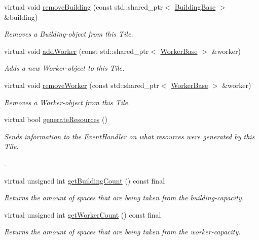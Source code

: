 \begin{DoxyCompactItemize}
virtual void \hyperlink{classCourse_1_1TileBase_a0cb0e1f7b13ca68b452e6f4846266d87}{remove\-Building} (const std\-::shared\-\_\-ptr$<$ \hyperlink{classCourse_1_1BuildingBase}{Building\-Base} $>$ \&building)
\begin{DoxyCompactList}\small\item\em Removes a Building-\/object from this Tile. \end{DoxyCompactList}\item 
virtual void \hyperlink{classCourse_1_1TileBase_ac512085412a2f4b9b30841ed265fd706}{add\-Worker} (const std\-::shared\-\_\-ptr$<$ \hyperlink{classCourse_1_1WorkerBase}{Worker\-Base} $>$ \&worker)
\begin{DoxyCompactList}\small\item\em Adds a new Worker-\/object to this Tile. \end{DoxyCompactList}\item 
virtual void \hyperlink{classCourse_1_1TileBase_ad1a1a40e737037d29dc8ece6798439f6}{remove\-Worker} (const std\-::shared\-\_\-ptr$<$ \hyperlink{classCourse_1_1WorkerBase}{Worker\-Base} $>$ \&worker)
\begin{DoxyCompactList}\small\item\em Removes a Worker-\/object from this Tile. \end{DoxyCompactList}\item 
virtual bool \hyperlink{classCourse_1_1TileBase_a4cd675a5d9890fb63282bb2d72aa52af}{generate\-Resources} ()
\begin{DoxyCompactList}\small\item\em Sends information to the Event\-Handler on what resources were generated by this Tile. \par
. \end{DoxyCompactList}\item 
virtual unsigned int \hyperlink{classCourse_1_1TileBase_a1a2be339a96e122eedcd3d5d8dd7095d}{get\-Building\-Count} () const final
\begin{DoxyCompactList}\small\item\em Returns the amount of spaces that are being taken from the building-\/capacity. \end{DoxyCompactList}\item 
virtual unsigned int \hyperlink{classCourse_1_1TileBase_ae3a8601af95ed2e8b29f4c764c939f05}{get\-Worker\-Count} () const final
\begin{DoxyCompactList}\small\item\em Returns the amount of spaces that are being taken from the worker-\/capacity. \end{DoxyCompactList}\item 

\end{DoxyCompactItemize}
